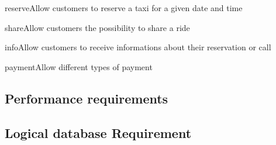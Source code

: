 \begin{Goal}{reserve}{Allow customers to reserve a taxi for a given date and time}{
}
\end{Goal}

\begin{Goal}{share}{Allow customers the possibility to share a ride}{
}
\end{Goal}

\begin{Goal}{info}{Allow customers to receive informations about their reservation or call}{
}
\end{Goal}

\begin{Goal}{payment}{Allow different types of payment}{
}
\end{Goal}


%
\subsection{Performance requirements}
\subsection{Logical database Requirement}

